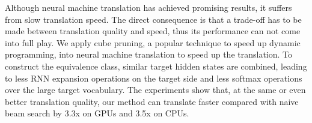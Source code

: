Although neural machine translation has achieved promising results, it suffers from slow translation speed. The direct consequence is that a trade-off has to be made between translation quality and speed, thus its performance can not come into full play. We apply cube pruning, a popular technique to speed up dynamic programming, into neural machine translation to speed up the translation. To construct the equivalence class, similar target hidden states are combined, leading to less RNN expansion operations on the target side and less softmax operations over the large target vocabulary. The experiments show that, at the same or even better translation quality, our method can translate faster compared with naive beam search by 3.3x on GPUs and 3.5x on CPUs.
